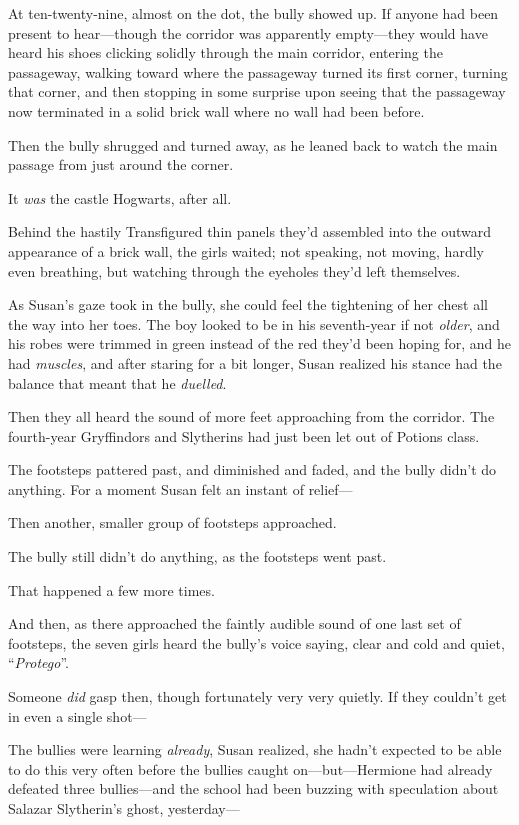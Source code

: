 \later

At ten-twenty-nine, almost on the dot, the bully showed up. If anyone had been present to hear—though the corridor was apparently empty—they would have heard his shoes clicking solidly through the main corridor, entering the passageway, walking toward where the passageway turned its first corner, turning that corner, and then stopping in some surprise upon seeing that the passageway now terminated in a solid brick wall where no wall had been before.

Then the bully shrugged and turned away, as he leaned back to watch the main passage from just around the corner.

It \emph{was} the castle Hogwarts, after all.

Behind the hastily Transfigured thin panels they’d assembled into the outward appearance of a brick wall, the girls waited; not speaking, not moving, hardly even breathing, but watching through the eyeholes they’d left themselves.

As Susan’s gaze took in the bully, she could feel the tightening of her chest all the way into her toes. The boy looked to be in his seventh-year if not \emph{older}, and his robes were trimmed in green instead of the red they’d been hoping for, and he had \emph{muscles}, and after staring for a bit longer, Susan realized his stance had the balance that meant that he \emph{duelled}.

Then they all heard the sound of more feet approaching from the corridor. The fourth-year Gryffindors and Slytherins had just been let out of Potions class.

The footsteps pattered past, and diminished and faded, and the bully didn’t do anything. For a moment Susan felt an instant of relief—

Then another, smaller group of footsteps approached.

The bully still didn’t do anything, as the footsteps went past.

That happened a few more times.

And then, as there approached the faintly audible sound of one last set of footsteps, the seven girls heard the bully’s voice saying, clear and cold and quiet, “\emph{Protego}”.

Someone \emph{did} gasp then, though fortunately very very quietly. If they couldn’t get in even a single shot—

The bullies were learning \emph{already}, Susan realized, she hadn’t expected \SPHEW to be able to do this very often before the bullies caught on—but—Hermione had already defeated three bullies—and the school had been buzzing with speculation about Salazar Slytherin’s ghost, yesterday—

